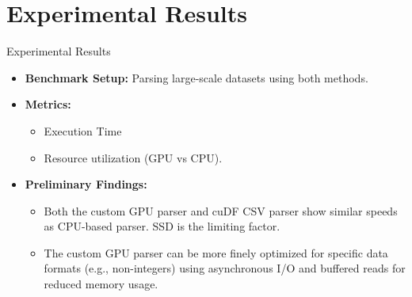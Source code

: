 \documentclass{beamer}
\begin{document}
\section{Experimental Results}
\begin{frame}{Experimental Results}
  \begin{itemize}
    \item \textbf{Benchmark Setup:} Parsing large-scale datasets using both methods.
    \item \textbf{Metrics:} 
      \begin{itemize}
        \item Execution Time
        \item Resource utilization (GPU vs CPU).
      \end{itemize}
    \item \textbf{Preliminary Findings:}
      \begin{itemize}
        \item Both the custom GPU parser and cuDF CSV parser show similar speeds as CPU-based parser. SSD is the limiting factor.
        \item The custom GPU parser can be more finely optimized for specific data formats (e.g., non-integers) using asynchronous I/O and buffered reads for reduced memory usage.
      \end{itemize}
  \end{itemize}

    
    

\end{frame}
\end{document}
